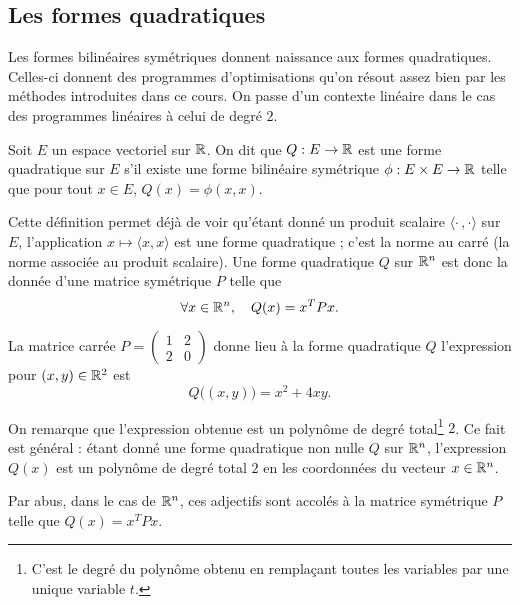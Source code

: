 \documentclass[11pt, a4paper]{article}
\begin{document}
\subsection{Les formes quadratiques}
\label{sec:fromquadra}

Les formes bilinéaires symétriques donnent naissance aux formes
quadratiques. Celles-ci donnent des programmes d'optimisations qu'on
résout assez bien par les méthodes introduites dans ce cours. On passe
d'un contexte linéaire dans le cas des programmes linéaires à celui de
degré $2$.
\begin{defn}
  Soit $E$ un espace vectoriel sur $\mathbb{R}$. On dit que $Q : E \to \mathbb{R}$ est une
  forme quadratique sur $E$ s'il existe une forme bilinéaire
  symétrique $\phi: E\times E \to \mathbb{R}$ telle que pour tout $x \in E$,
  $Q(x) = \phi(x, x)$.
\end{defn}
\noindent Cette définition permet déjà de voir qu'étant donné un
produit scalaire $\langle \cdot\, ,\cdot\rangle$ sur $E$,
l'application $x \mapsto \langle x, x \rangle$ est une forme
quadratique ; c'est la norme au carré (la norme associée au produit
scalaire).  Une forme quadratique $Q$ sur $\mathbb{R}^n$ est donc la donnée
d'une matrice symétrique $P$ telle que
\[
\forall x \in \mathbb{R}^n, \quad Q(x) = x^TPx.
\]
\begin{exmp}
  La matrice carrée $P = \begin{pmatrix} 1 & 2 \\ 2 & 0 \end{pmatrix}$
  donne lieu à la forme quadratique $Q$ l'expression
  pour $(x, y) \in \mathbb{R}^2$ est
  \[
  Q\big((x, y)\big) = x^2 + 4xy.
  \]
\end{exmp}
\noindent On remarque que l'expression obtenue est un polynôme de degré
total\footnote{C'est le degré du polynôme obtenu en rempla\c{c}ant
  toutes les variables par une unique variable $t$.} $2$. Ce fait est
général : étant donné une forme quadratique non nulle $Q$ sur $\mathbb{R}^n$,
l'expression $Q(x)$ est un polynôme de degré total $2$ en les
coordonnées du vecteur $x \in \mathbb{R}^n$.
\begin{rem}
  Par abus, dans le cas de $\mathbb{R}^n$, ces adjectifs sont accolés à la
  matrice symétrique $P$ telle que $Q(x) = x^TPx$.
\end{rem}
\end{document}
